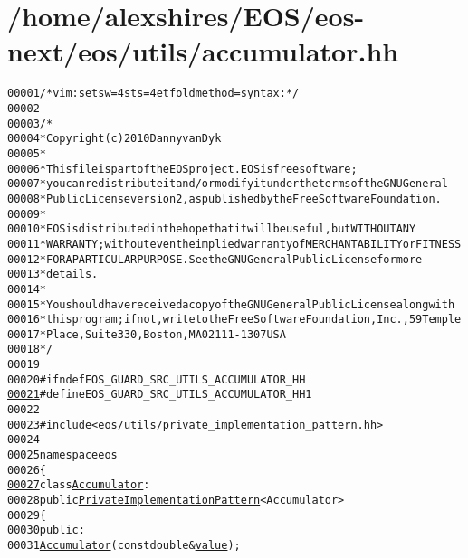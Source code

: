 \hypertarget{accumulator_8hh_source}{
\section{/home/alexshires/EOS/eos-\/next/eos/utils/accumulator.hh}
}


\begin{footnotesize}\begin{alltt}
00001 \textcolor{comment}{/* vim: set sw=4 sts=4 et foldmethod=syntax : */}
00002 
00003 \textcolor{comment}{/*}
00004 \textcolor{comment}{ * Copyright (c) 2010 Danny van Dyk}
00005 \textcolor{comment}{ *}
00006 \textcolor{comment}{ * This file is part of the EOS project. EOS is free software;}
00007 \textcolor{comment}{ * you can redistribute it and/or modify it under the terms of the GNU General}
00008 \textcolor{comment}{ * Public License version 2, as published by the Free Software Foundation.}
00009 \textcolor{comment}{ *}
00010 \textcolor{comment}{ * EOS is distributed in the hope that it will be useful, but WITHOUT ANY}
00011 \textcolor{comment}{ * WARRANTY; without even the implied warranty of MERCHANTABILITY or FITNESS}
00012 \textcolor{comment}{ * FOR A PARTICULAR PURPOSE.  See the GNU General Public License for more}
00013 \textcolor{comment}{ * details.}
00014 \textcolor{comment}{ *}
00015 \textcolor{comment}{ * You should have received a copy of the GNU General Public License along with}
00016 \textcolor{comment}{ * this program; if not, write to the Free Software Foundation, Inc., 59 Temple}
00017 \textcolor{comment}{ * Place, Suite 330, Boston, MA  02111-1307  USA}
00018 \textcolor{comment}{ */}
00019 
00020 \textcolor{preprocessor}{#ifndef EOS\_GUARD\_SRC\_UTILS\_ACCUMULATOR\_HH}
\hypertarget{accumulator_8hh_source_l00021}{}\hyperlink{accumulator_8hh_a67029bc7ee4702ebdf5383678131963e}{00021} \textcolor{preprocessor}{}\textcolor{preprocessor}{#define EOS\_GUARD\_SRC\_UTILS\_ACCUMULATOR\_HH 1}
00022 \textcolor{preprocessor}{}
00023 \textcolor{preprocessor}{#include <\hyperlink{private__implementation__pattern_8hh}{eos/utils/private_implementation_pattern.hh}>}
00024 
00025 \textcolor{keyword}{namespace }eos
00026 \{
\hypertarget{accumulator_8hh_source_l00027}{}\hyperlink{classeos_1_1Accumulator}{00027}     \textcolor{keyword}{class }\hyperlink{classeos_1_1Accumulator}{Accumulator} :
00028         \textcolor{keyword}{public} \hyperlink{classeos_1_1PrivateImplementationPattern}{PrivateImplementationPattern}<Accumulator>
00029     \{
00030         \textcolor{keyword}{public}:
00031             \hyperlink{classeos_1_1Accumulator_a0cb3aeb61f40c0aaa89f65957be8b994}{Accumulator}(\textcolor{keyword}{const} \textcolor{keywordtype}{double} & \hyperlink{classeos_1_1Accumulator_a6fc737db7b42656c0435c9d6cedb62b0}{value});

\end{alltt}
\end{footnotesize}
